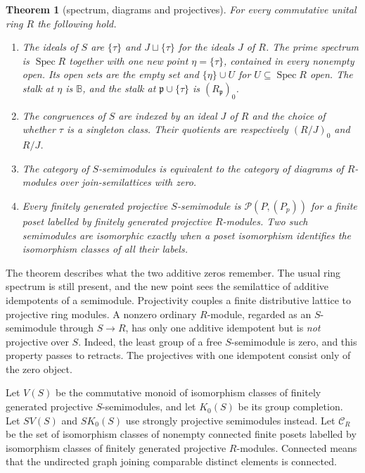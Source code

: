 \documentclass[11pt]{amsart}
\newcommand{\B}{\mathbb B}
\DeclareMathOperator{\Spec}{Spec}
\newtheorem{theorem}{Theorem}[section]
\theoremstyle{definition}
\theoremstyle{remark}
\begin{document}
\begin{theorem}[spectrum, diagrams and projectives]\label{thm:main}
For every commutative unital ring $R$ the following hold.
\begin{enumerate}
\item The ideals of $S$ are $\{\tau\}$ and $J\sqcup\{\tau\}$ for the ideals $J$ of $R$. The prime spectrum is $\Spec R$ together with one new point $\eta=\{\tau\}$, contained in every nonempty open. Its open sets are the empty set and $\{\eta\}\cup U$ for $U\subseteq\Spec R$ open. The stalk at $\eta$ is $\B$, and the stalk at $\mathfrak p\cup\{\tau\}$ is $(R_{\mathfrak p})_0$.
\item The congruences of $S$ are indexed by an ideal $J$ of $R$ and the choice of whether $\tau$ is a singleton class. Their quotients are respectively $(R/J)_0$ and $R/J$.
\item The category of $S$-semimodules is equivalent to the category of diagrams of $R$-modules over join-semilattices with zero.
\item Every finitely generated projective $S$-semimodule is $\mathcal P(P,(P_p))$ for a finite poset labelled by finitely generated projective $R$-modules. Two such semimodules are isomorphic exactly when a poset isomorphism identifies the isomorphism classes of all their labels.
\end{enumerate}
\end{theorem}

The theorem describes what the two additive zeros remember. The usual ring spectrum is still present, and the new point sees the semilattice of additive idempotents of a semimodule. Projectivity couples a finite distributive lattice to projective ring modules. A nonzero ordinary $R$-module, regarded as an $S$-semimodule through $S\to R$, has only one additive idempotent but is \emph{not} projective over $S$. Indeed, the least group of a free $S$-semimodule is zero, and this property passes to retracts. The projectives with one idempotent consist only of the zero object.

Let $V(S)$ be the commutative monoid of isomorphism classes of finitely generated projective $S$-semimodules, and let $K_0(S)$ be its group completion. Let $SV(S)$ and $SK_0(S)$ use strongly projective semimodules instead. Let $\mathcal C_R$ be the set of isomorphism classes of nonempty connected finite posets labelled by isomorphism classes of finitely generated projective $R$-modules. Connected means that the undirected graph joining comparable distinct elements is connected.
\end{document}
